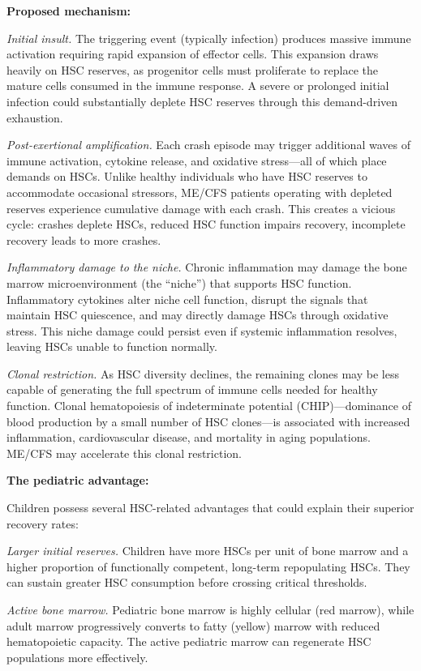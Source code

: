 \begin{speculation}
\textbf{Proposed mechanism:}

\textit{Initial insult.} The triggering event (typically infection) produces massive immune activation requiring rapid expansion of effector cells. This expansion draws heavily on HSC reserves, as progenitor cells must proliferate to replace the mature cells consumed in the immune response. A severe or prolonged initial infection could substantially deplete HSC reserves through this demand-driven exhaustion.

\textit{Post-exertional amplification.} Each crash episode may trigger additional waves of immune activation, cytokine release, and oxidative stress---all of which place demands on HSCs. Unlike healthy individuals who have HSC reserves to accommodate occasional stressors, ME/CFS patients operating with depleted reserves experience cumulative damage with each crash. This creates a vicious cycle: crashes deplete HSCs, reduced HSC function impairs recovery, incomplete recovery leads to more crashes.

\textit{Inflammatory damage to the niche.} Chronic inflammation may damage the bone marrow microenvironment (the ``niche'') that supports HSC function. Inflammatory cytokines alter niche cell function, disrupt the signals that maintain HSC quiescence, and may directly damage HSCs through oxidative stress. This niche damage could persist even if systemic inflammation resolves, leaving HSCs unable to function normally.

\textit{Clonal restriction.} As HSC diversity declines, the remaining clones may be less capable of generating the full spectrum of immune cells needed for healthy function. Clonal hematopoiesis of indeterminate potential (CHIP)---dominance of blood production by a small number of HSC clones---is associated with increased inflammation, cardiovascular disease, and mortality in aging populations. ME/CFS may accelerate this clonal restriction.

\textbf{The pediatric advantage:}

Children possess several HSC-related advantages that could explain their superior recovery rates:

\textit{Larger initial reserves.} Children have more HSCs per unit of bone marrow and a higher proportion of functionally competent, long-term repopulating HSCs. They can sustain greater HSC consumption before crossing critical thresholds.

\textit{Active bone marrow.} Pediatric bone marrow is highly cellular (red marrow), while adult marrow progressively converts to fatty (yellow) marrow with reduced hematopoietic capacity. The active pediatric marrow can regenerate HSC populations more effectively.


\end{speculation}
